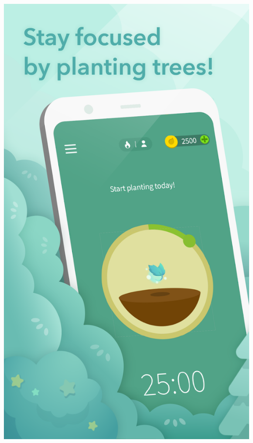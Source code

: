 \documentclass[11pt]{article}
\begin{document}
\begin{center}
\includegraphics[width=.9\linewidth]{./docs/1.png}
\end{center}
\end{document}
